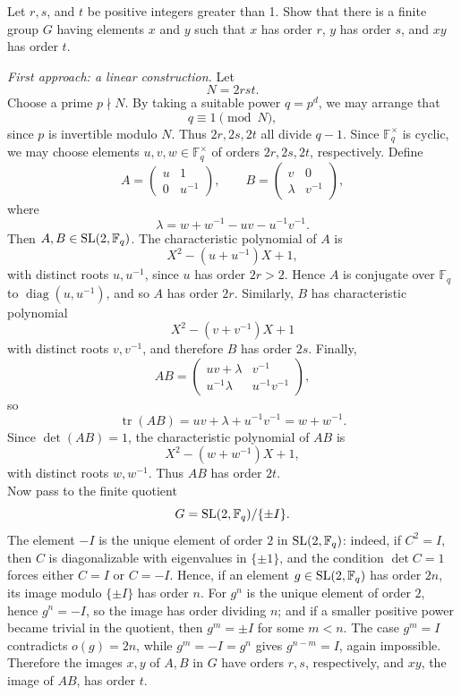 \documentclass[../Odyssey_Project.tex]{subfiles}
\begin{document}
\begin{exercise}
\label{ex:1.5}
Let $r, s$, and $t$ be positive integers greater than 1. Show that there is a finite group $G$ having elements $x$ and $y$ such that $x$ has order $r$, $y$ has order $s$, and $xy$ has order $t$.
\end{exercise}
\begin{solution}
\noindent\emph{First approach: a linear construction.}
Let
\[
    N = 2rst.
\]
Choose a prime \(p \nmid N\). By taking a suitable power \(q=p^d\), we may arrange that
\[
    q \equiv 1 \pmod N,
\]
since \(p\) is invertible modulo \(N\). Thus \(2r,2s,2t\) all divide \(q-1\). Since \(\mathbb F_q^{\times}\) is cyclic, we may choose elements \(u,v,w \in \mathbb F_q^{\times}\) of orders \(2r,2s,2t\), respectively. Define
\[
    A =
    \begin{pmatrix}
        u & 1 \\
        0 & u^{-1}
    \end{pmatrix},
    \qquad
    B =
    \begin{pmatrix}
        v & 0 \\
        \lambda & v^{-1}
    \end{pmatrix},
\]
where
\[
    \lambda = w+w^{-1}-uv-u^{-1}v^{-1}.
\]
Then \(A,B \in \operatorname{SL}(2,\mathbb F_q)\). The characteristic polynomial of \(A\) is
\[
    X^2-(u+u^{-1})X+1,
\]
with distinct roots \(u,u^{-1}\), since \(u\) has order \(2r>2\). Hence \(A\) is conjugate over \(\mathbb F_q\) to \(\operatorname{diag}(u,u^{-1})\), and so \(A\) has order \(2r\). Similarly, \(B\) has characteristic polynomial
\[
    X^2-(v+v^{-1})X+1
\]
with distinct roots \(v,v^{-1}\), and therefore \(B\) has order \(2s\). Finally,
\[
    AB =
    \begin{pmatrix}
        uv+\lambda & v^{-1} \\
        u^{-1}\lambda & u^{-1}v^{-1}
    \end{pmatrix},
\]
so
\[
    \operatorname{tr}(AB)=uv+\lambda+u^{-1}v^{-1}=w+w^{-1}.
\]
Since \(\det(AB)=1\), the characteristic polynomial of \(AB\) is
\[
    X^2-(w+w^{-1})X+1,
\]
with distinct roots \(w,w^{-1}\). Thus \(AB\) has order \(2t\). \\
Now pass to the finite quotient
\[
    G = \operatorname{SL}(2,\mathbb F_q)/\{\pm I\}.
\]
The element \(-I\) is the unique element of order \(2\) in \(\operatorname{SL}(2,\mathbb F_q)\): indeed, if \(C^2=I\), then \(C\) is diagonalizable with eigenvalues in \(\{\pm1\}\), and the condition \(\det C=1\) forces either \(C=I\) or \(C=-I\). Hence, if an element \(g \in \operatorname{SL}(2,\mathbb F_q)\) has order \(2n\), its image modulo \(\{\pm I\}\) has order \(n\). For \(g^n\) is the unique element of order \(2\), hence \(g^n=-I\), so the image has order dividing \(n\); and if a smaller positive power became trivial in the quotient, then \(g^m=\pm I\) for some \(m<n\). The case \(g^m=I\) contradicts \(o(g)=2n\), while \(g^m=-I=g^n\) gives \(g^{n-m}=I\), again impossible. Therefore the images \(x,y\) of \(A,B\) in \(G\) have orders \(r,s\), respectively, and \(xy\), the image of \(AB\), has order \(t\).


\end{solution}
\end{document}
